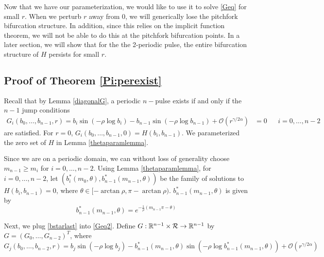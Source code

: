 \documentclass[thesis.tex]{subfiles}
\begin{document}
Now that we have our parameterization, we would like to use it to solve \eqref{Geq} for small $r$. When we perturb $r$ away from 0, we will generically lose the pitchfork bifurcation structure. In addition, since this relies on the implicit function theorem, we will not be able to do this at the pitchfork bifurcation points. In a later section, we will show that for the the 2-periodic pulse, the entire bifurcation structure of $H$ persists for small $r$.

\subsection{Proof of Theorem \ref{Pi:perexist}}

Recall that by Lemma \ref{diagonalG}, a periodic $n-$pulse exists if and only if the $n-1$ jump conditions
\begin{align}\label{Geq2}
G_i(b_0, \dots, b_{n-1}, r) = b_i \sin \left( -\rho \log b_i \right) - b_{n-1} \sin \left( -\rho \log b_{n-1} \right) + \mathcal{O}(r^{\gamma / 2 \alpha}) &= 0 && i = 0, \dots, n-2
\end{align}
are satisfied. For $r = 0$, $G_i(b_0, \dots, b_{n-1}, 0) = H(b_i, b_{n-1})$. We parameterized the zero set of $H$ in Lemma \ref{thetaparamlemma}. 

Since we are on a periodic domain, we can without loss of generality choose $m_{n-1} \geq m_i$ for $i = 0, \dots, n-2$. Using Lemma \ref{thetaparamlemma}, for $i = 0, \dots, n-2$, let $(b_i^*(m_0, \theta), b_{n-1}^*(m_{n-1}, \theta))$ be the family of solutions to $H(b_i, b_{n-1}) = 0$, where $\theta \in [-\arctan \rho, \pi - \arctan \rho)$. $b_{n-1}^*(m_{n-1}, \theta)$ is given by
\begin{equation}\label{bstarlast}
b_{n-1}^*(m_{n-1}, \theta) = e^{-\frac{1}{\rho}(m_{n-1}\pi - \theta)}
\end{equation}

Next, we plug \eqref{bstarlast} into \eqref{Geq2}. Define $G: {\mathbb R}^{n-1} \times \mathcal{R} \rightarrow {\mathbb R}^{n-1}$ by $G = (G_0, \dots, G_{n-2})^T$, where 
\begin{equation*}
G_j(b_0, \dots, b_{n-2}, r) = b_j \sin \left( -\rho \log b_j \right) - b_{n-1}^*(m_{n-1}, \theta) \sin \left( -\rho \log b_{n-1}^*(m_{n-1}, \theta) \right) + \mathcal{O}(r^{\gamma / 2 \alpha})
\end{equation*}
\end{document}
